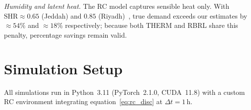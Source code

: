 \documentclass[3p,number]{elsarticle}
\let\oldsection\section
\renewcommand{\section}{\FloatBarrier\oldsection}
\begin{document}
\emph{Humidity and latent heat.}
The RC model captures sensible heat only.
With $\mathrm{SHR}\approx0.65$ (Jeddah) and $0.85$ (Riyadh)~\cite{Rodrigues2025}, true demand exceeds our estimates by ${\approx}54\%$ and ${\approx}18\%$ respectively; because both THERM and RBRL share this penalty, percentage savings remain valid.
 
\section{Simulation Setup}
\label{sec:sim}
 
All simulations run in Python~3.11 (PyTorch~2.1.0, CUDA~11.8) with a custom RC environment integrating equation~\eqref{eq:rc_disc} at $\Delta t=1\,\text{h}$.
\end{document}
